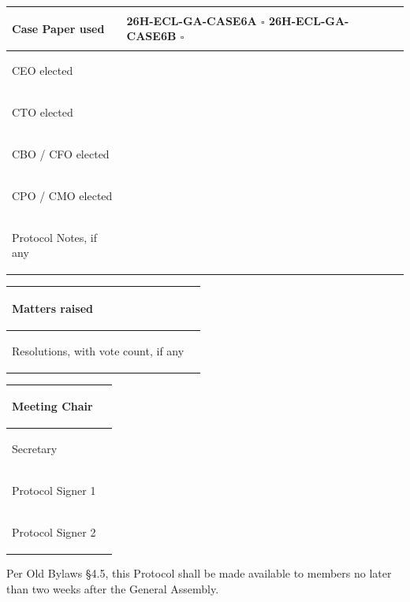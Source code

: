 \documentclass{../../../Common/Latex/Templates/rapport}
\begin{document}
\begin{tabularx}{\textwidth}{|>{\bfseries\raggedright\arraybackslash}p{5cm}|X|}
  \hline
  Case Paper used   & \rule{0pt}{0.9cm}26H-ECL-GA-CASE6A \quad $\square$ \quad\quad 26H-ECL-GA-CASE6B \quad $\square$ \\
  \hline
  CEO elected       & \rule{0pt}{0.9cm}                                                                              \\
  \hline
  CTO elected       & \rule{0pt}{0.9cm}                                                                              \\
  \hline
  CBO / CFO elected & \rule{0pt}{0.9cm}                                                                              \\
  \hline
  CPO / CMO elected & \rule{0pt}{0.9cm}                                                                              \\
  \hline
  Protocol Notes, if any & \rule{0pt}{1.2cm}                                                                         \\
  \hline
\end{tabularx}

\begin{tabularx}{\textwidth}{|>{\bfseries\raggedright\arraybackslash}p{5cm}|X|}
  \hline
  Matters raised                              & \rule{0pt}{1.8cm} \\
  \hline
  Resolutions, with vote count, if any        & \rule{0pt}{1.8cm} \\
  \hline
\end{tabularx}

\rule{0pt}{3cm}

\begin{tabularx}{\textwidth}{|>{\bfseries\raggedright\arraybackslash}p{5cm}|X|}
  \hline
  Meeting Chair     & \rule{0pt}{1.4cm} \\
  \hline
  Secretary         & \rule{0pt}{1.4cm} \\
  \hline
  Protocol Signer 1 & \rule{0pt}{1.4cm} \\
  \hline
  Protocol Signer 2 & \rule{0pt}{1.4cm} \\
  \hline
\end{tabularx}

\vspace{0.4cm}
Per Old Bylaws \S4.5, this Protocol shall be made available to members no later than two weeks after the General Assembly.
\end{document}
